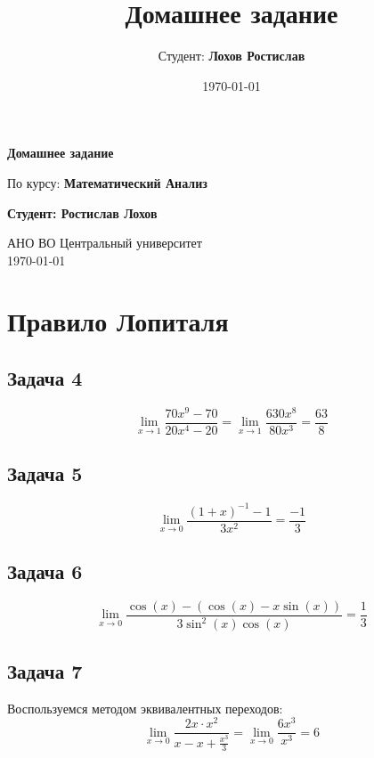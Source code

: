 \documentclass[a4paper,12pt]{article}
\title{Домашнее задание}
\author{Студент: \textbf{Лохов Ростислав}}
\date{\today}
\begin{document}
\begin{titlepage}
    \centering
    \vspace*{1cm}

    \Huge
    \textbf{Домашнее задание}

    \vspace{0.5cm}
    \LARGE
    По курсу: \textbf{Математический Анализ}

    \vspace{1.5cm}

    \textbf{Студент: Ростислав Лохов}

    \vfill

    \Large
    АНО ВО Центральный университет\\
    \vspace{0.3cm}
    \today

\end{titlepage}

\tableofcontents
\newpage

\section{Правило Лопиталя}

\subsection{Задача 4}
\[
\lim_{x \to 1} \frac{70x^9-70}{20x^4-20} = \lim_{x \to 1} \frac{630x^8}{80x^3} = \frac{63}{8}
\]

\subsection{Задача 5}
\[
\lim_{x \to 0} \frac{(1+x)^{-1}-1}{3x^2} = \frac{-1}{3}
\]

\subsection{Задача 6}
\[
\lim_{x \to 0} \frac{\cos(x) - (\cos(x) - x\sin(x))}{3\sin^2(x)\cos(x)} = \frac{1}{3}
\]

\subsection{Задача 7}

Воспользуемся методом эквивалентных переходов:
\[
\lim_{x \to 0} \frac{2x\cdot x^2}{x - x + \frac{x^3}{3}} = \lim_{x \to 0} \frac{6x^3}{x^3} = 6
\]
\end{document}
